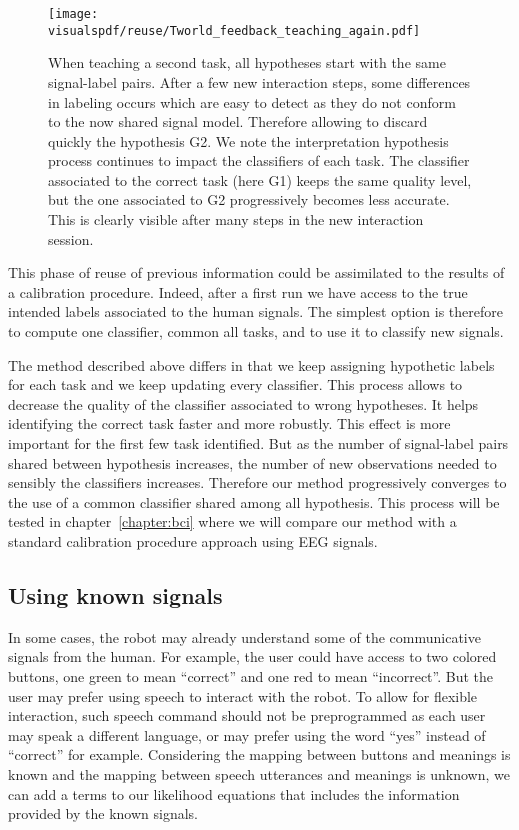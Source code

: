 \begin{figure}[!htbp]
  \centering
  \texttt{[image: \\visualspdf/reuse/Tworld\_feedback\_teaching\_again.pdf]}
  \caption{When teaching a second task, all hypotheses start with the same signal-label pairs. After a few new interaction steps, some differences in labeling occurs which are easy to detect as they do not conform to the now shared signal model. Therefore allowing to discard quickly the hypothesis G2. We note the interpretation hypothesis process continues to impact the classifiers of each task. The classifier associated to the correct task (here G1) keeps the same quality level, but the one associated to G2 progressively becomes less accurate. This is clearly visible after many steps in the new interaction session.}
  \label{fig:TworldReuse}
\end{figure}

This phase of reuse of previous information could be assimilated to the results of a calibration procedure. Indeed, after a first run we have access to the true intended labels associated to the human signals. The simplest option is therefore to compute one classifier, common all tasks, and to use it to classify new signals.

The method described above differs in that we keep assigning hypothetic labels for each task and we keep updating every classifier. This process allows to decrease the quality of the classifier associated to wrong hypotheses. It helps identifying the correct task faster and more robustly. This effect is more important for the first few task identified. But as the number of signal-label pairs shared between hypothesis increases, the number of new observations needed to sensibly the classifiers increases. Therefore our method progressively converges to the use of a common classifier shared among all hypothesis. This process will be tested in chapter~\ref{chapter:bci} where we will compare our method with a standard calibration procedure approach using EEG signals.

\subsection{Using known signals}
\label{chapter:lfui:known}

In some cases, the robot may already understand some of the communicative signals from the human. For example, the user could have access to two colored buttons, one green to mean ``correct'' and one red to mean ``incorrect''. But the user may prefer using speech to interact with the robot. To allow for flexible interaction, such speech command should not be preprogrammed as each user may speak a different language, or may prefer using the word ``yes'' instead of ``correct'' for example. Considering the mapping between buttons and meanings is known and the mapping between speech utterances and meanings is unknown, we can add a terms to our likelihood equations that includes the information provided by the known signals.

